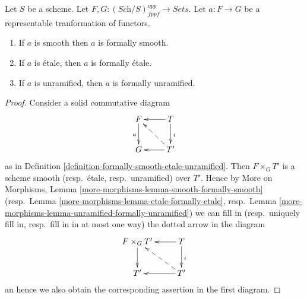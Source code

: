 \begin{lemma}
\label{lemma-representable-property-formally-property}
Let $S$ be a scheme.
Let $F, G : (\textit{Sch}/S)_{fppf}^{opp} \to \textit{Sets}$.
Let $a : F \to G$ be a representable tranformation of functors.
\begin{enumerate}
\item If $a$ is smooth then $a$ is formally smooth.
\item If $a$ is \'etale, then $a$ is formally \'etale.
\item If $a$ is unramified, then $a$ is formally unramified.
\end{enumerate}
\end{lemma}

\begin{proof}
Consider a solid commutative diagram
$$
\xymatrix{
F \ar[d]_a & T \ar[d]^i \ar[l] \\
G & T' \ar[l] \ar@{-->}[lu]
}
$$
as in
Definition \ref{definition-formally-smooth-etale-unramified}.
Then $F \times_G T'$ is a scheme smooth (resp.\ \'etale, resp.\ unramified)
over $T'$. Hence by
More on Morphisms, Lemma \ref{more-morphisms-lemma-smooth-formally-smooth}
(resp.\ Lemma \ref{more-morphisms-lemma-etale-formally-etale}, 
resp.\ Lemma \ref{more-morphisms-lemma-unramified-formally-unramified})
we can fill in (resp.\ uniquely fill in, resp.\ fill in in at most
one way) the dotted arrow in the diagram
$$
\xymatrix{
F \times_G T' \ar[d] & T \ar[d]^i \ar[l] \\
T' & T' \ar[l] \ar@{-->}[lu]
}
$$
an hence we also obtain the corresponding assertion in the first diagram.
\end{proof}

